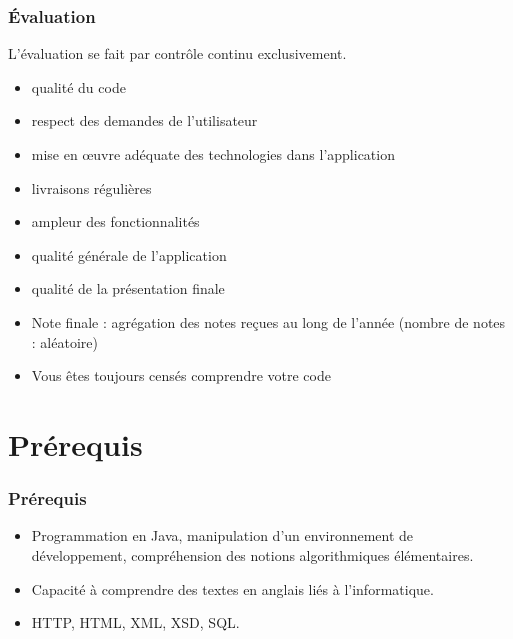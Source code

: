 \documentclass[english, french]{beamer}
\begin{document}
\begin{frame}
	\frametitle{Évaluation}
	L’évaluation se fait par contrôle continu exclusivement.
	\begin{itemize}
		\item qualité du code 
		\item respect des demandes de l’utilisateur
		\item mise en œuvre adéquate des technologies dans l’application
		\item livraisons régulières
		\item ampleur des fonctionnalités
		\item qualité générale de l’application
		\item qualité de la présentation finale
		\item Note finale : agrégation des notes reçues au long de l’année (nombre de notes : aléatoire)
		\item Vous êtes toujours censés comprendre votre code
	\end{itemize}
\end{frame}

\section{Prérequis}
\begin{frame}
	\frametitle{Prérequis}
	\begin{itemize}
		\item Programmation en Java, manipulation d’un environnement de développement, compréhension des notions algorithmiques élémentaires.
		\item Capacité à comprendre des textes en anglais liés à l’informatique.
		\item HTTP, HTML, XML, XSD, SQL.
	\end{itemize}
\end{frame}
\end{document}
